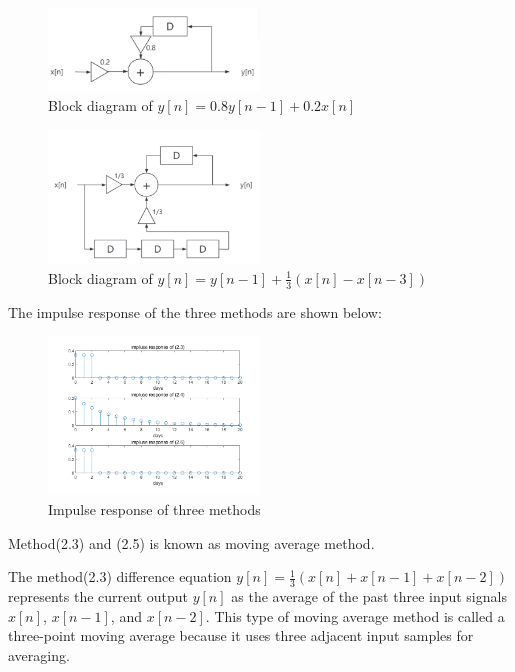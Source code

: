 \documentclass[journal]{IEEEtran}
\begin{document}
\begin{figure}[H]
   \centering
   \includegraphics[width=0.5\textwidth]{2.2.2.png} %
   \caption{Block diagram of $y[n] = 0.8y[n-1]+0.2x[n]$ }
   \label{fig:2.2.2}
\end{figure}

\begin{figure}[H]
   \centering
   \includegraphics[width=0.5\textwidth]{2.2.3.png} %
   \caption{Block diagram of $y[n] = y[n-1]+\frac{1}{3}(x[n]-x[n-3])$ }
   \label{fig:2.2.3} 
\end{figure}
 

The impulse response of the three methods are shown below:
\begin{figure}[H]
   \centering
   \includegraphics[width=0.5\textwidth]{2.2.png} %
   \caption{Impulse response of three methods   }
   \label{fig:2.2} 
\end{figure}
 
Method(2.3) and (2.5) is known as moving average method.

The method(2.3) difference equation $y[n] = \frac{1}{3}(x[n] + x[n-1] + x[n-2])$ represents the current output $y[n]$ as the average of the past three input signals $x[n]$, $x[n-1]$, and $x[n-2]$. This type of moving average method is called a three-point moving average because it uses three adjacent input samples for averaging.
\end{document}
